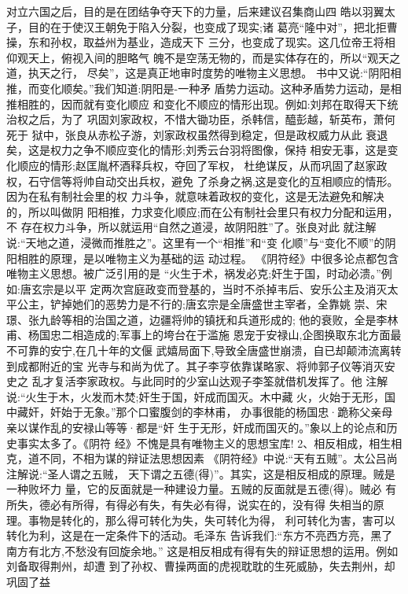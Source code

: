 \documentclass[12pt,UTF8]{ctexbook}
\begin{document}
对立六国之后，目的是在团结争夺天下的力量，后来建议召集商山四
皓以羽翼太子，目的在于使汉王朝免于陷入分裂，也变成了现实;诸
葛亮“隆中对”，把北拒曹操，东和孙权，取益州为基业，造成天下
三分，也变成了现实。这几位帝王将相仰观天上，俯视入间的胆略气
魄不是空荡无物的，而是实体存在的，所以“观天之道，执天之行，
尽矣”，这是真正地审时度势的唯物主义思想。
书中又说:“阴阳相推，而变化顺矣。”我们知道:阴阳是-一种矛
盾势力运动。这种矛盾势力运动，是相推相胜的，因而就有变化顺应
和变化不顺应的情形出现。例如:刘邦在取得天下统治权之后，为了
巩固刘家政权，不惜大锄功臣，杀韩信，醯彭越，斩英布，萧何死于
狱中，张良从赤松子游，刘家政权虽然得到稳定，但是政权威力从此
衰退矣，这是权力之争不顺应变化的情形;刘秀云台羽将图像，保持
相安无事，这是变化顺应的情形;赵匡胤杯酒释兵权，夺回了军权，
杜绝谋反，从而巩固了赵家政权，石守信等将帅自动交出兵权，避免
了杀身之祸,这是变化的互相顺应的情形。因为在私有制社会里的权
力斗争，就意味着政权的变化，这是无法避免和解决的，所以叫做阴
阳相推，力求变化顺应;而在公有制社会里只有权力分配和运用，不
存在权力斗争，所以就运用“自然之道浸，故阴阳胜”了。张良对此
就注解说:“天地之道，浸微而推胜之”。这里有一个“相推”和“变
化顺”与“变化不顺”的阴阳相胜的原理，是以唯物主义为基础的运
动过程。
《阴符经》中很多论点都包含唯物主义思想。被广泛引用的是
“火生于术，祸发必克;奸生于国，时动必溃。”例如:唐玄宗是以平
定两次宫庭政变而登基的，当时不杀掉韦后、安乐公主及消灭太平公主，铲掉她们的恶势力是不行的;唐玄宗是全唐盛世主宰者，全靠姚
崇、宋璟、张九龄等相的治国之道，边疆将帅的镇抚和兵道形成的;
他的衰败，全是李林甫、杨国忠二相造成的;军事上的垮台在于滥施
恩宠于安禄山,企图换取东北方面最不可靠的安宁,在几十年的文偃
武嬉局面下,导致全唐盛世崩溃，自已却颠沛流离转到成都附近的宝
光寺与和尚为优了。其子李亨依靠谋略家、将帅郭子仪等消灭安史之
乱才复活李家政权。与此同时的少室山达观子李筌就借机发挥了。他
注解说:“火生于木，火发而木焚;奸生于国，奸成而国灭。木中藏
火，火始于无形，国中藏奸，奸始于无象。”那个口蜜腹剑的李林甫，
办事很能的杨国忠·跪称父亲母亲以谋作乱的安禄山等等·都是“奸
生于无形，奸成而国灭的。”象以上的论点和历史事实太多了。《阴符
经》不愧是具有唯物主义的思想宝库!
2、相反相成，相生相克，道不同，不相为谋的辩证法思想因素
《阴符经》中说:“天有五贼”。太公吕尚注解说:“圣人谓之五贼，
天下谓之五德(得)”。其实，这是相反相成的原理。贼是一种败坏力
量，它的反面就是一种建设力量。五贼的反面就是五德(得)。贼必
有所失，德必有所得，有得必有失，有失必有得，说实在的，没有得
失相当的原理。事物是转化的，那么得可转化为失，失可转化为得，
利可转化为害，害可以转化为利，这是在一定条件下的活动。毛泽东
告诉我们:“东方不亮西方亮，黑了南方有北方,不愁没有回旋余地。”
这是相反相成有得有失的辩证思想的运用。例如刘备取得荆州，却遭
到了孙权、曹操两面的虎视耽耽的生死威胁，失去荆州，却巩固了益
\end{document}
